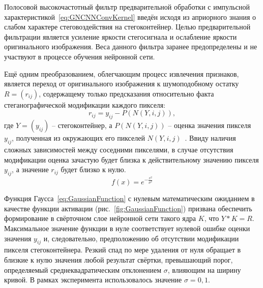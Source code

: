 Полосовой высокочастотный фильтр предварительной обработки с импульсной характеристикой~\eqref{eq:GNCNNConvKernel} введён исходя из априорного знания о слабом характере стеговоздействия на стегоконтейнер. Целью предварительной фильтрации является усиление яркости стегосигнала и ослабление яркости оригинального изображения. Веса данного фильтра заранее предопределены и не участвуют в процессе обучения нейронной сети.

Ещё одним преобразованием, облегчающим процесс извлечения признаков, является переход от оригинального изображения к шумоподобному остатку $ R = (r_{ij}) $, содержащему только предсказания относительно факта стеганографической модификации каждого пикселя:
\begin{equation*}
r_{ij} = y_{ij} - P(N(Y, i, j)),
\end{equation*}
где $ Y = (y_{ij}) $ – стегоконтейнер, а $ P(N(Y, i, j)) $ – оценка значения пикселя $ y_{ij} $, полученная из окружающих его пикселей $ N(Y, i, j) $~\cite{FridrichNoiseResidual}. Ввиду наличия сложных зависимостей между соседними пикселями, в случае отсутствия модификации оценка зачастую будет близка к действительному значению пикселя $ y_{ij} $, а значение $ r_{ij} $ будет близко к нулю.
\begin{equation}
\label{eq:GaussianFunction}
f(x) = e^{-\frac{x^2}{\sigma^2}}
\end{equation}

Функция Гаусса~\eqref{eq:GaussianFunction} с нулевым математическим ожиданием в качестве функции активации (рис.~\ref{fig:GaussianFunction}) призвана обеспечить формирование в свёрточном слое нейронной сети такого ядра $ K $, что $ Y*K = R $. Максимальное значение функции в нуле соответствует нулевой ошибке оценки значения $ y_{ij} $ и, следовательно, предположению об отсутствии модификации пикселя стегоконтейнера. Резкий спад по мере удаления от нуля обращает в близкие к нулю значения любой результат свёртки, превышающий порог, определяемый среднеквадратическим отклонением $ \sigma $, влияющим на ширину кривой. В рамках эксперимента использовалось значение $ \sigma = 0,1 $.

